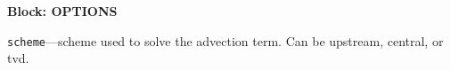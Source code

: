 
\item \textbf{Block: OPTIONS}

\begin{description}
\item \texttt{scheme}---scheme used to solve the advection term.  Can be upstream, central, or tvd.

\end{description}

